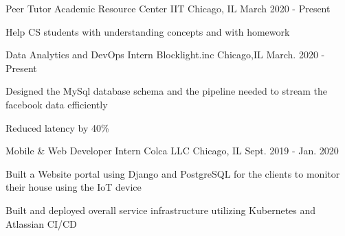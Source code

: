 

\begin{cventries}
  \cventry
    {Peer Tutor} %
    {Academic Resource Center IIT} %
    {Chicago, IL} %
    {March 2020 - Present} %
    {
      \begin{cvitems} %
        \item {Help CS students with understanding concepts and with homework}
      \end{cvitems}
    }
  \cventry
    {Data Analytics and DevOps Intern} %
    {Blocklight.inc} %
    {Chicago,IL} %
    {March. 2020 - Present} %
    {
      \begin{cvitems} %
        \item {Designed the MySql database schema and the pipeline needed to stream the facebook data efficiently}
        \item {Reduced latency by 40\%}
      \end{cvitems}
    }

  \cventry
    {Mobile \& Web Developer Intern} %
    {Colca LLC} %
    {Chicago, IL} %
    {Sept. 2019 - Jan. 2020} %
    {
      \begin{cvitems} %
        \item {Built a Website portal using Django and PostgreSQL for the clients to monitor their house using the IoT device}
        \item {Built and deployed overall service infrastructure utilizing Kubernetes and Atlassian CI/CD}
      \end{cvitems}
    }


\end{cventries}
